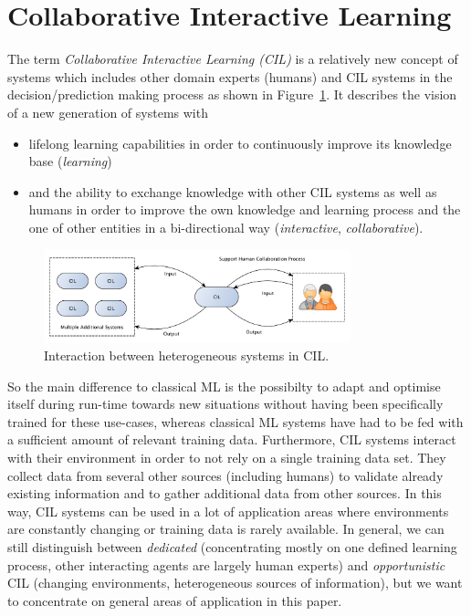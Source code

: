 \documentclass[conference]{IEEEtran}
\begin{document}
\section{Collaborative Interactive Learning}\label{sec:cil}
The term \textit{Collaborative Interactive Learning (CIL)} is a relatively new concept of systems which 
includes other domain experts (humans) and CIL systems in the decision/prediction making process 
as shown in Figure~\ref{fig:CIL}. It describes the vision of a new 
generation of systems with
\begin{itemize}
    \item lifelong learning capabilities in order to continuously improve its 
        knowledge base (\textit{learning})
    \item and the ability to exchange knowledge with other CIL systems as well as humans 
        in order to improve the own knowledge and learning process and the one of other entities in a 
        bi-directional way (\textit{interactive}, \textit{collaborative})\cite{CIL:sick}.
\end{itemize}
\begin{figure}[!h]
\centering
\includegraphics[width=3.5in]{images/CIL}
\caption{Interaction between heterogeneous systems in CIL.}
\label{fig:CIL}
\end{figure}
So the main difference to classical ML is the possibilty to adapt and optimise itself during run-time 
towards new situations without having been specifically trained for these use-cases, whereas classical ML 
systems have had to be fed with a sufficient amount of relevant training data\cite{CIL:sick}\cite{Organic:schloer}.
Furthermore, CIL systems interact with their environment in order to not rely on a single training data set. 
They collect data from several other sources (including humans) to validate already existing information and to 
gather additional data from other sources. In this way, CIL systems can be used in a lot of application areas where 
environments are constantly changing or training data is rarely available.
In general, we can still distinguish between \textit{dedicated} (concentrating mostly on one defined learning process, 
other interacting agents are largely human experts) and \textit{opportunistic} CIL (changing environments, heterogeneous 
sources of information)\cite{CIL:sick}, 
but we want to concentrate on general areas of application in this paper.
\end{document}
